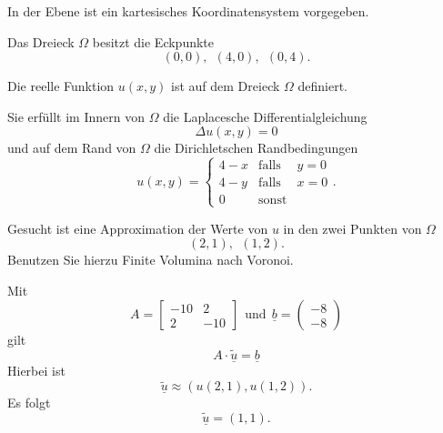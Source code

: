 In der Ebene ist ein kartesisches Koordinatensystem vorgegeben. 

\vspace{2mm}

Das Dreieck $\Omega$ besitzt die Eckpunkte
\[
(0,0), \ \ (4,0), \ \ (0,4).
\]

Die reelle Funktion $u(x,y)$ ist auf dem Dreieck $\Omega$ definiert. 

\vspace{2mm}

Sie erfüllt im Innern von $\Omega$ die Laplacesche Differentialgleichung 
\[
\Delta u(x,y) = 0
\]
und auf dem Rand von $\Omega$ die Dirichletschen Randbedingungen 
\[
u(x,y) = \left\{ \begin{array}{ccc} 4 - x & \mbox{falls} & y = 0
\\ 4 - y & \mbox{falls} & x = 0  \\ 0  & \mbox{sonst} & \end{array} \right.       .
\]

Gesucht ist eine Approximation der Werte von $u$ in den zwei Punkten
von $\Omega$ 
\[
(2,1), \ \ (1,2).
\]
Benutzen Sie hierzu Finite Volumina nach Voronoi.

\begin{loesung}
Mit
\[
A = \left[\begin{array}{rr} -10 & 2  \\ 2 & -10  \end{array}\right] \ \ \mbox{und} \ \
  \underline{b} =  \left(\begin{array}{r} -8 \\ -8 \end{array}\right)
\]
gilt  
\[
A \cdot \underline{\tilde u} = \underline{b}
\]
Hierbei ist
\[
\underline{\tilde u} \approx (u(2,1), u(1,2)).
\]
Es folgt 
\[
\underline{\tilde u} = (1,1).
\]
\end{loesung}
